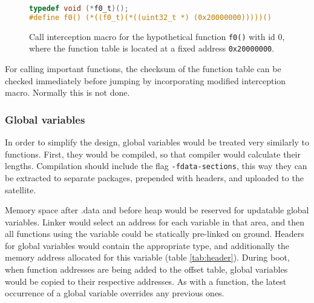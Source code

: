 \begin{figure} [htb]
\begin{lstlisting}[language=C]
typedef void (*f0_t)();
#define f0() (*((f0_t)(*((uint32_t *) (0x20000000)))))()
\end{lstlisting}
\caption{Call interception macro for the hypothetical function \texttt{f0()} with id $0$, \\where the function table is located at a fixed address \texttt{0x20000000}.}
\label{fig:macro}
\end{figure}

For calling important functions, the checksum of the function table can be checked immediately before jumping by incorporating modified interception macro. Normally this is not done.

\subsubsection{Global variables}

In order to simplify the design, global variables would be treated very similarly to functions. First, they would be compiled, so that compiler would calculate their lengths. Compilation should include the flag \texttt{-fdata-sections}, this way they can be extracted to separate packages, prepended with headers, and uploaded to the satellite.

Memory space after .data and before heap would be reserved for updatable global variables. Linker would select an address for each variable in that area, and then all functions using the variable could be statically pre-linked on ground. Headers for global variables would contain the appropriate type, and additionally the memory address allocated for this variable (table \ref{tab:header}). During boot, when function addresses are being added to the offset table, global variables would be copied to their respective addresses. As with a function, the latest occurrence of a global variable overrides any previous ones.
